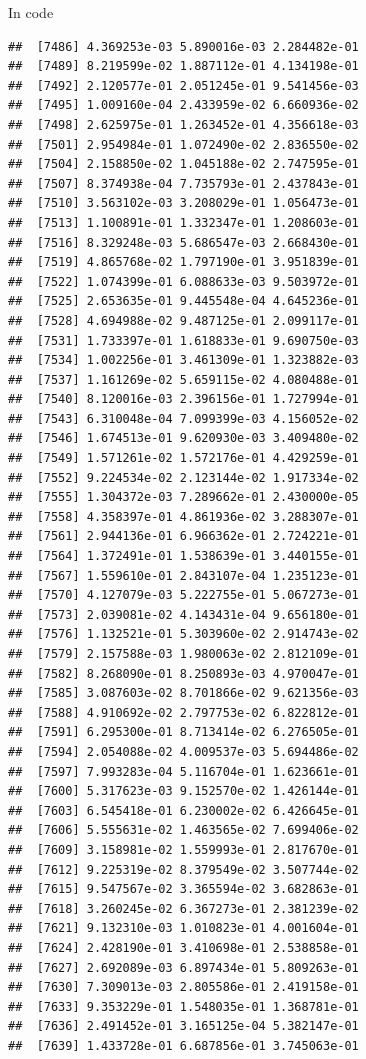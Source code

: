 \documentclass[ignorenonframetext,]{beamer}
\begin{document}
\begin{frame}[fragile]{In code}
\begin{verbatim}
##  [7486] 4.369253e-03 5.890016e-03 2.284482e-01
##  [7489] 8.219599e-02 1.887112e-01 4.134198e-01
##  [7492] 2.120577e-01 2.051245e-01 9.541456e-03
##  [7495] 1.009160e-04 2.433959e-02 6.660936e-02
##  [7498] 2.625975e-01 1.263452e-01 4.356618e-03
##  [7501] 2.954984e-01 1.072490e-02 2.836550e-02
##  [7504] 2.158850e-02 1.045188e-02 2.747595e-01
##  [7507] 8.374938e-04 7.735793e-01 2.437843e-01
##  [7510] 3.563102e-03 3.208029e-01 1.056473e-01
##  [7513] 1.100891e-01 1.332347e-01 1.208603e-01
##  [7516] 8.329248e-03 5.686547e-03 2.668430e-01
##  [7519] 4.865768e-02 1.797190e-01 3.951839e-01
##  [7522] 1.074399e-01 6.088633e-03 9.503972e-01
##  [7525] 2.653635e-01 9.445548e-04 4.645236e-01
##  [7528] 4.694988e-02 9.487125e-01 2.099117e-01
##  [7531] 1.733397e-01 1.618833e-01 9.690750e-03
##  [7534] 1.002256e-01 3.461309e-01 1.323882e-03
##  [7537] 1.161269e-02 5.659115e-02 4.080488e-01
##  [7540] 8.120016e-03 2.396156e-01 1.727994e-01
##  [7543] 6.310048e-04 7.099399e-03 4.156052e-02
##  [7546] 1.674513e-01 9.620930e-03 3.409480e-02
##  [7549] 1.571261e-02 1.572176e-01 4.429259e-01
##  [7552] 9.224534e-02 2.123144e-02 1.917334e-02
##  [7555] 1.304372e-03 7.289662e-01 2.430000e-05
##  [7558] 4.358397e-01 4.861936e-02 3.288307e-01
##  [7561] 2.944136e-01 6.966362e-01 2.724221e-01
##  [7564] 1.372491e-01 1.538639e-01 3.440155e-01
##  [7567] 1.559610e-01 2.843107e-04 1.235123e-01
##  [7570] 4.127079e-03 5.222755e-01 5.067273e-01
##  [7573] 2.039081e-02 4.143431e-04 9.656180e-01
##  [7576] 1.132521e-01 5.303960e-02 2.914743e-02
##  [7579] 2.157588e-03 1.980063e-02 2.812109e-01
##  [7582] 8.268090e-01 8.250893e-03 4.970047e-01
##  [7585] 3.087603e-02 8.701866e-02 9.621356e-03
##  [7588] 4.910692e-02 2.797753e-02 6.822812e-01
##  [7591] 6.295300e-01 8.713414e-02 6.276505e-01
##  [7594] 2.054088e-02 4.009537e-03 5.694486e-02
##  [7597] 7.993283e-04 5.116704e-01 1.623661e-01
##  [7600] 5.317623e-03 9.152570e-02 1.426144e-01
##  [7603] 6.545418e-01 6.230002e-02 6.426645e-01
##  [7606] 5.555631e-02 1.463565e-02 7.699406e-02
##  [7609] 3.158981e-02 1.559993e-01 2.817670e-01
##  [7612] 9.225319e-02 8.379549e-02 3.507744e-02
##  [7615] 9.547567e-02 3.365594e-02 3.682863e-01
##  [7618] 3.260245e-02 6.367273e-01 2.381239e-02
##  [7621] 9.132310e-03 1.010823e-01 4.001604e-01
##  [7624] 2.428190e-01 3.410698e-01 2.538858e-01
##  [7627] 2.692089e-03 6.897434e-01 5.809263e-01
##  [7630] 7.309013e-03 2.805586e-01 2.419158e-01
##  [7633] 9.353229e-01 1.548035e-01 1.368781e-01
##  [7636] 2.491452e-01 3.165125e-04 5.382147e-01
##  [7639] 1.433728e-01 6.687856e-01 3.745063e-01

\end{verbatim}
\end{frame}
\end{document}
